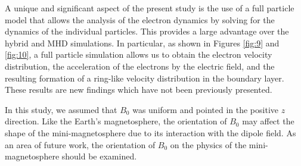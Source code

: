 \documentclass[draft,jgrga]{agutex2015}
\begin{document}
\begin{article}
A unique and significant aspect of the present study is the use of a full particle model
that allows the analysis of the electron dynamics by solving for the dynamics of the individual particles.
This provides a large advantage over 
the hybrid and MHD simulations.
In particular, as shown in Figures \ref{fig:9} and \ref{fig:10}, a full particle simulation
allows us to obtain the electron velocity distribution, 
the acceleration of the electrons by the electric field, and 
the resulting formation of a ring-like velocity distribution 
in the boundary layer.
These results are new findings  
which have not been previously presented.

In this study, we assumed that $B_{\mathrm{0}}$ was uniform and pointed 
in the positive $z$ direction.
Like the Earth's magnetosphere, 
the orientation of $B_{\mathrm{0}}$ may affect the shape of 
the mini-magnetosphere due to its interaction with the dipole field. 
As an area of future work, the orientation of $B_{\mathrm{0}}$ 
on the physics of the mini-magnetosphere 
should be examined.


\end{article}
\end{document}
